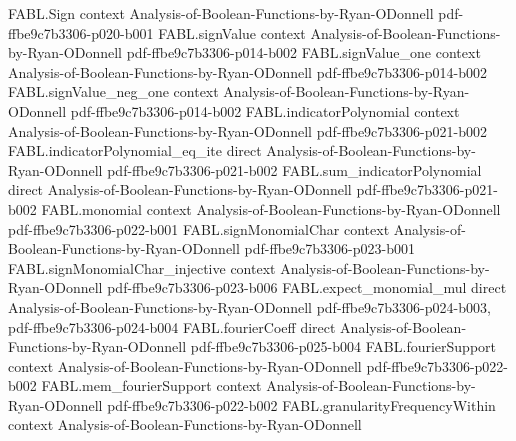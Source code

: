 \begin{theorem}
\label{FABL.hasDerivAt_biasedMinusProbabilityPolynomial_eq_totalInfluence}
\leanok
{}
\proofstep
  {FABL.Sign}
  {context}
  {Analysis-of-Boolean-Functions-by-Ryan-ODonnell}
  {pdf-ffbe9c7b3306-p020-b001}
\proofstep
  {FABL.signValue}
  {context}
  {Analysis-of-Boolean-Functions-by-Ryan-ODonnell}
  {pdf-ffbe9c7b3306-p014-b002}
\proofstep
  {FABL.signValue_one}
  {context}
  {Analysis-of-Boolean-Functions-by-Ryan-ODonnell}
  {pdf-ffbe9c7b3306-p014-b002}
\proofstep
  {FABL.signValue_neg_one}
  {context}
  {Analysis-of-Boolean-Functions-by-Ryan-ODonnell}
  {pdf-ffbe9c7b3306-p014-b002}
\proofstep
  {FABL.indicatorPolynomial}
  {context}
  {Analysis-of-Boolean-Functions-by-Ryan-ODonnell}
  {pdf-ffbe9c7b3306-p021-b002}
\proofstep
  {FABL.indicatorPolynomial_eq_ite}
  {direct}
  {Analysis-of-Boolean-Functions-by-Ryan-ODonnell}
  {pdf-ffbe9c7b3306-p021-b002}
\proofstep
  {FABL.sum_indicatorPolynomial}
  {direct}
  {Analysis-of-Boolean-Functions-by-Ryan-ODonnell}
  {pdf-ffbe9c7b3306-p021-b002}
\proofstep
  {FABL.monomial}
  {context}
  {Analysis-of-Boolean-Functions-by-Ryan-ODonnell}
  {pdf-ffbe9c7b3306-p022-b001}
\proofstep
  {FABL.signMonomialChar}
  {context}
  {Analysis-of-Boolean-Functions-by-Ryan-ODonnell}
  {pdf-ffbe9c7b3306-p023-b001}
\proofstep
  {FABL.signMonomialChar_injective}
  {context}
  {Analysis-of-Boolean-Functions-by-Ryan-ODonnell}
  {pdf-ffbe9c7b3306-p023-b006}
\proofstep
  {FABL.expect_monomial_mul}
  {direct}
  {Analysis-of-Boolean-Functions-by-Ryan-ODonnell}
  {pdf-ffbe9c7b3306-p024-b003,
    pdf-ffbe9c7b3306-p024-b004}
\proofstep
  {FABL.fourierCoeff}
  {direct}
  {Analysis-of-Boolean-Functions-by-Ryan-ODonnell}
  {pdf-ffbe9c7b3306-p025-b004}
\proofstep
  {FABL.fourierSupport}
  {context}
  {Analysis-of-Boolean-Functions-by-Ryan-ODonnell}
  {pdf-ffbe9c7b3306-p022-b002}
\proofstep
  {FABL.mem_fourierSupport}
  {context}
  {Analysis-of-Boolean-Functions-by-Ryan-ODonnell}
  {pdf-ffbe9c7b3306-p022-b002}
\proofstep
  {FABL.granularityFrequencyWithin}
  {context}
  {Analysis-of-Boolean-Functions-by-Ryan-ODonnell}

\end{theorem}
